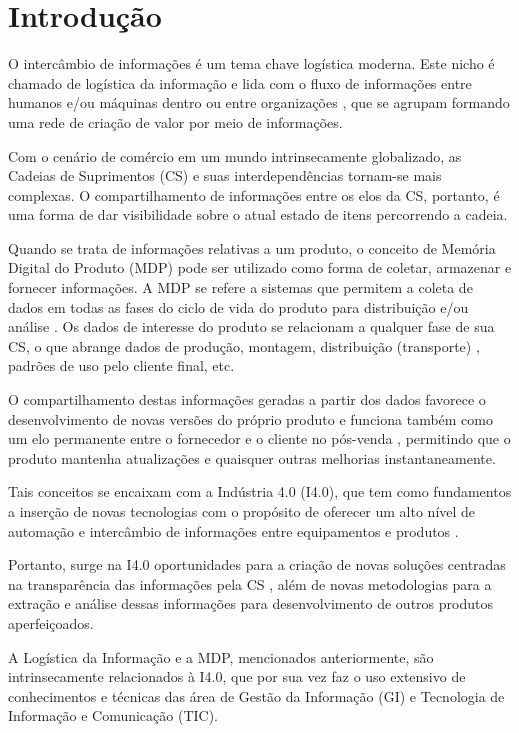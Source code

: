 \chapter{Introdução}
\label{cha:introducao}

O intercâmbio de informações é um tema chave logística moderna. Este nicho é chamado de logística da informação e lida com o fluxo de informações entre humanos e/ou máquinas dentro ou entre organizações \cite{haftor2011information}, que se agrupam formando uma rede de criação de valor por meio de informações.

Com o cenário de comércio em um mundo intrinsecamente globalizado, as Cadeias de Suprimentos (CS) e suas interdependências tornam-se mais complexas. O compartilhamento de informações entre os elos da CS, portanto, é uma forma de dar visibilidade sobre o atual estado de itens percorrendo a cadeia.

Quando se trata de informações relativas a um produto, o conceito de Memória Digital do Produto (MDP) pode ser utilizado como forma de coletar, armazenar e fornecer informações. A MDP se refere a sistemas que permitem a coleta de dados em todas as fases do ciclo de vida do produto para distribuição e/ou análise \cite{wahlster2007digitalmemory}. Os dados de interesse do produto se relacionam a qualquer fase de sua CS, o que abrange dados de produção, montagem, distribuição (transporte) \cite{brandherm2011productmemory}, padrões de uso pelo cliente final, etc.

O compartilhamento destas informações geradas a partir dos dados favorece o desenvolvimento de novas versões do próprio produto e funciona também como um elo permanente entre o fornecedor e o cliente no pós-venda \cite{brandherm2011productmemory}, permitindo que o produto mantenha atualizações e quaisquer outras melhorias instantaneamente.

Tais conceitos se encaixam com a Indústria 4.0 (I4.0), que tem como fundamentos a inserção de novas tecnologias com o propósito de oferecer um alto nível de automação e intercâmbio de informações entre equipamentos e produtos \cite{lasi2014industryfour}.

Portanto, surge na I4.0 oportunidades para a criação de novas soluções centradas na transparência das informações pela CS \cite{lasi2014industryfour}, além de novas metodologias para a extração e análise dessas informações para desenvolvimento de outros produtos aperfeiçoados.

A Logística da Informação e a MDP, mencionados anteriormente, são intrinsecamente relacionados à I4.0, que por sua vez faz o uso extensivo de conhecimentos e técnicas das área de Gestão da Informação (GI) e Tecnologia de Informação e Comunicação (TIC).

